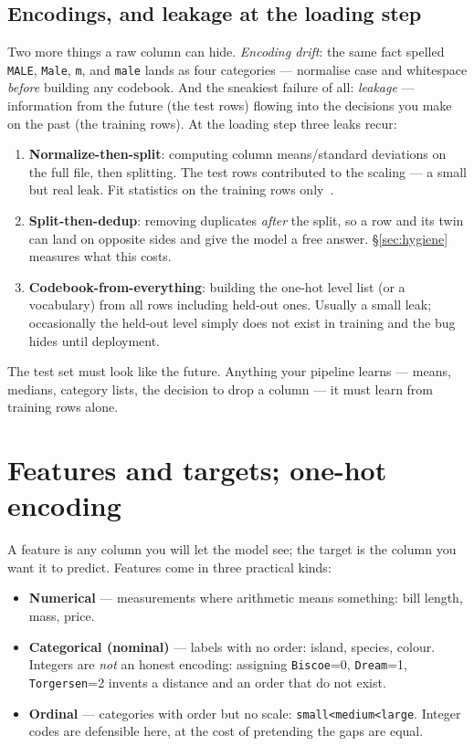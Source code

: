 \subsection{Encodings, and leakage at the loading step}\label{sec:loadleak}

Two more things a raw column can hide. \emph{Encoding drift}: the same fact
spelled \texttt{MALE}, \texttt{Male}, \texttt{m}, and \texttt{male} lands as
four categories --- normalise case and whitespace \emph{before} building any
codebook. And the sneakiest failure of all:
\emph{leakage} --- information from the future (the test rows)
flowing into the decisions you make on the past (the training rows). At the
loading step three leaks recur:

\begin{enumerate}
\item \textbf{Normalize-then-split}: computing column means/standard
  deviations on the full file, then splitting. The test rows contributed to
  the scaling --- a small but real leak. Fit statistics on the training rows
  only~\cite{sklearnpitfalls}.
\item \textbf{Split-then-dedup}: removing duplicates \emph{after} the split,
  so a row and its twin can land on opposite sides and give the model a free
  answer. \S\ref{sec:hygiene} measures what this costs.
\item \textbf{Codebook-from-everything}: building the one-hot level list (or a
  vocabulary) from all rows including held-out ones. Usually a small leak;
  occasionally the held-out level simply does not exist in training and the
  bug hides until deployment.
\end{enumerate}

The test set must look like the future. Anything your pipeline learns ---
means, medians, category lists, the decision to drop a column --- it must
learn from training rows alone.

\section{Features and targets; one-hot encoding}\label{sec:onehot}

A feature is any column you will let the model see; the target is the column
you want it to predict. Features come in three practical kinds:

\begin{itemize}
\item \textbf{Numerical} --- measurements where arithmetic means something:
  bill length, mass, price.
\item \textbf{Categorical (nominal)} --- labels with
  no order: island, species, colour. Integers are \emph{not} an honest
  encoding: assigning \texttt{Biscoe}=0, \texttt{Dream}=1,
  \texttt{Torgersen}=2 invents a distance and an order that do not exist.
\item \textbf{Ordinal} --- categories with order but no scale:
  \texttt{small<medium<large}. Integer codes are defensible here, at the cost
  of pretending the gaps are equal.
\end{itemize}

